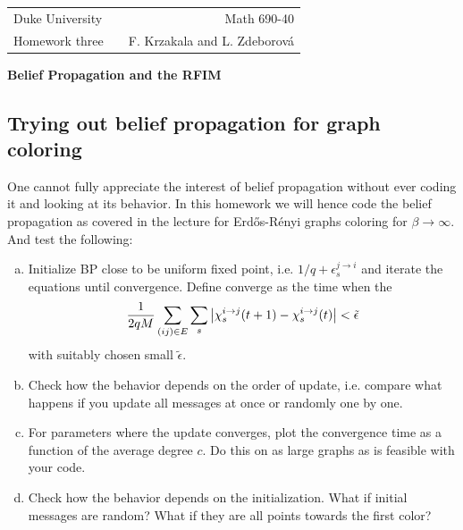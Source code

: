 \documentclass[a4paper,oneside,12pt]{article}
\begin{document}
\noindent

\begin{tabular}{lcr}
  Duke University & & Math 690-40 \\  
  Homework three & \hspace{6.3cm} & F. Krzakala and L. Zdeborov\'a\\ \hline
\end{tabular}

\begin{center}
  {\Large {\bf Belief Propagation and the RFIM}}
\end{center}


\subsection*{Trying out belief propagation for graph coloring}

One cannot fully appreciate the interest of belief propagation without ever coding it and looking at its behavior. 
In this homework we will hence code the belief propagation as covered in the lecture for Erd\H{o}s-R\'enyi graphs coloring for $ \beta \to \infty $. And test the following: 

\begin{enumerate}[(a)]
\item
        Initialize BP close to be uniform fixed point, i.e. $ 1/q + \epsilon^{j\to i}_s $ and iterate the equations until convergence. 
        Define converge as the time when the 
        \begin{equation*}
            \frac{1}{2 q M} \sum_{(ij) \in E} \sum_s \left|  \chi_s^{i \to j}(t+1) - \chi_s^{i \to j}(t)  \right| < \tilde{\epsilon}
        \end{equation*}
        with suitably chosen small $ \tilde{\epsilon} $.
\item
        Check how the behavior depends on the order of update, i.e. compare what happens if you update all messages at once or randomly one by one.
\item
        For parameters where the update converges, plot the convergence time as a function of the average degree $c$. Do this on as large graphs as is feasible with your code.
\item   
        Check how the behavior depends on the initialization. 
        What if initial messages are random? 
        What if they are all points towards the first color?
\end{enumerate}
\end{document}
